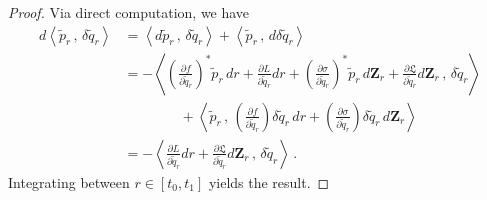 \documentclass[11pt, oneside]{article}
\numberwithin{equation}{section}
\theoremstyle{definition}
\newcommand{\wt}[1]{\widetilde{#1}}
\newcommand{\mc}[1]{\mathcal{#1}}
\newcommand{\mcal}[1]{\mc{#1}}
\newcommand{\scp}[2]{{\left\langle {#1}\, , \, {#2}\right\rangle}}
\def\p{{\partial}}
\def\rmd{{\rm d}}
\def\p{\partial}
\begin{document}
\begin{proof}
Via direct computation, we have
    \begin{align*}
        d\scp{\wt{p}_r}{\delta\wt{q}_r}
        &= \scp{d\wt{p}_r}{\delta\wt{q}_r} + \scp{\wt{p}_r}{d\delta\wt{q}_r}\\
        &= -\scp{\left(\frac{\p f}{\p \wt{q}_r}\right)^*\wt{p}_r\,dr + \frac{\p L}{\p \wt{q}_r}dr + \left(\frac{\p \sigma}{\p \wt{q}_r}\right)^* \wt{p}_r\,d\mathbf{Z}_r + \frac{\p \mathfrak{L}}{\p \wt{q}_r}d\mathbf{Z}_r}{\delta\wt{q}_r} \\
        & \qquad \qquad + \scp{\wt{p}_r}{\left(\frac{\p f}{\p \wt{q}_r}\right)\delta\wt{q}_r \,dr + \left(\frac{\p \sigma}{\p \wt{q}_r}\right)\delta\wt{q}_r \,d\mathbf{Z}_r}\\
        & = -\scp{\frac{\p L}{\p \wt{q}_r}dr + \frac{\p \mathfrak{L}}{\p \wt{q}_r}d\mathbf{Z}_r}{\delta \wt{q}_r}\,.
    \end{align*}
    Integrating between $r\in[t_0,t_1]$ yields the result.
\end{proof}
\end{document}
